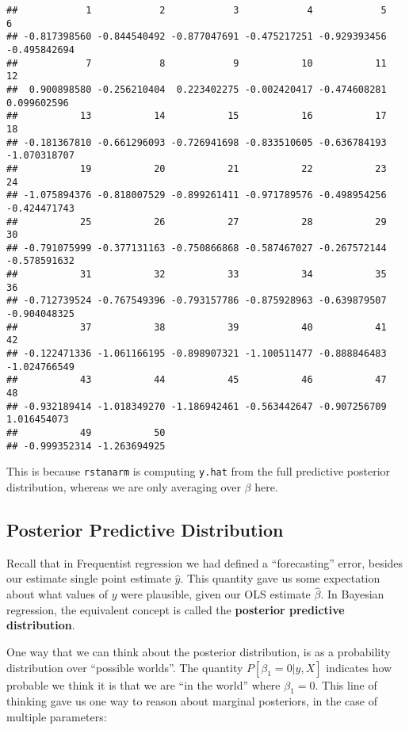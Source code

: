 \documentclass[
]{article}
\begin{document}
\begin{verbatim}
##            1            2            3            4            5            6 
## -0.817398560 -0.844540492 -0.877047691 -0.475217251 -0.929393456 -0.495842694 
##            7            8            9           10           11           12 
##  0.900898580 -0.256210404  0.223402275 -0.002420417 -0.474608281  0.099602596 
##           13           14           15           16           17           18 
## -0.181367810 -0.661296093 -0.726941698 -0.833510605 -0.636784193 -1.070318707 
##           19           20           21           22           23           24 
## -1.075894376 -0.818007529 -0.899261411 -0.971789576 -0.498954256 -0.424471743 
##           25           26           27           28           29           30 
## -0.791075999 -0.377131163 -0.750866868 -0.587467027 -0.267572144 -0.578591632 
##           31           32           33           34           35           36 
## -0.712739524 -0.767549396 -0.793157786 -0.875928963 -0.639879507 -0.904048325 
##           37           38           39           40           41           42 
## -0.122471336 -1.061166195 -0.898907321 -1.100511477 -0.888846483 -1.024766549 
##           43           44           45           46           47           48 
## -0.932189414 -1.018349270 -1.186942461 -0.563442647 -0.907256709  1.016454073 
##           49           50 
## -0.999352314 -1.263694925
\end{verbatim}

This is because \texttt{rstanarm} is computing \texttt{y.hat} from the
full predictive posterior distribution, whereas we are only averaging
over \(\beta\) here.

\hypertarget{posterior-predictive-distribution}{%
\subsection{Posterior Predictive
Distribution}\label{posterior-predictive-distribution}}

Recall that in Frequentist regression we had defined a ``forecasting''
error, besides our estimate single point estimate \(\hat y\). This
quantity gave us some expectation about what values of \(y\) were
plausible, given our OLS estimate \(\hat \beta\). In Bayesian
regression, the equivalent concept is called the \textbf{posterior
predictive distribution}.

One way that we can think about the posterior distribution, is as a
probability distribution over ``possible worlds''. The quantity
\(P[\beta_1 = 0 | y, X]\) indicates how probable we think it is that we
are ``in the world'' where \(\beta_1 = 0\). This line of thinking gave
us one way to reason about marginal posteriors, in the case of multiple
parameters:
\end{document}
